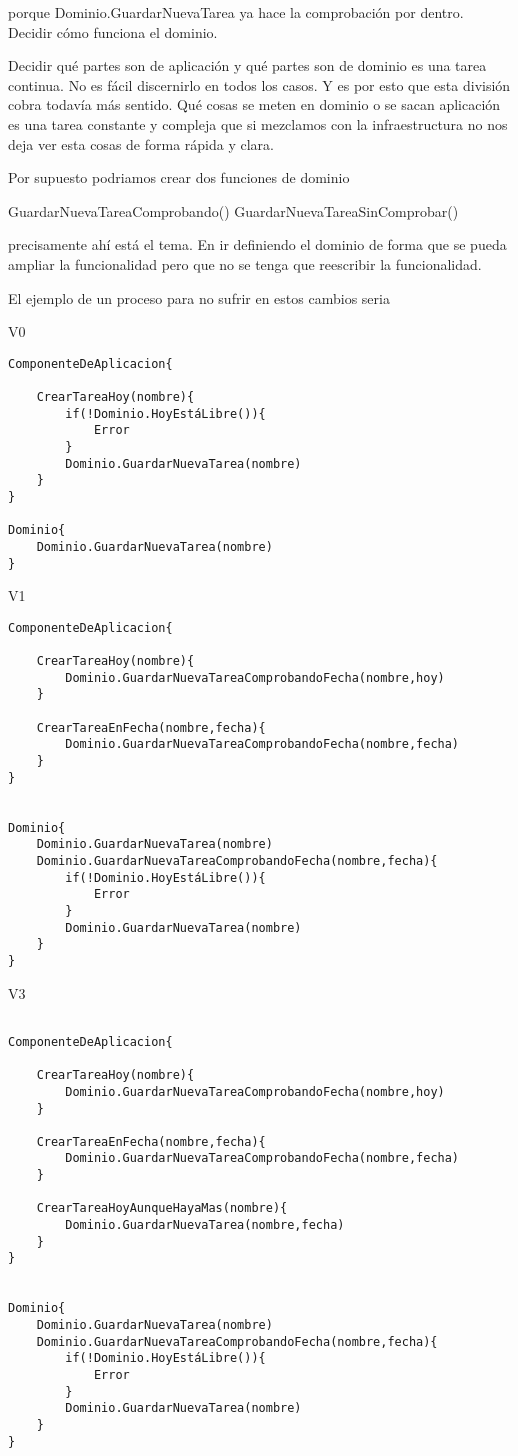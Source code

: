 porque Dominio.GuardarNuevaTarea ya hace la comprobación por dentro. Decidir cómo funciona el dominio.

Decidir qué partes son de aplicación y qué partes son de dominio es una tarea continua. No es fácil discernirlo en todos los casos. Y es por esto que esta división cobra todavía más sentido. Qué cosas se meten en dominio o se sacan aplicación es una tarea constante y compleja que si mezclamos con la infraestructura no nos deja ver esta cosas de forma rápida y clara.

Por supuesto podriamos crear dos funciones de dominio

GuardarNuevaTareaComprobando()
GuardarNuevaTareaSinComprobar()

precisamente ahí está el tema. En ir definiendo el dominio de forma que se pueda ampliar la funcionalidad pero que no se tenga que reescribir la funcionalidad.

El ejemplo de un proceso para no sufrir en estos cambios seria

V0

\begin{verbatim}
ComponenteDeAplicacion{

    CrearTareaHoy(nombre){
        if(!Dominio.HoyEstáLibre()){
            Error
        }
        Dominio.GuardarNuevaTarea(nombre)
    }
}

Dominio{
    Dominio.GuardarNuevaTarea(nombre)
}

\end{verbatim}

V1

\begin{verbatim}
ComponenteDeAplicacion{

    CrearTareaHoy(nombre){
        Dominio.GuardarNuevaTareaComprobandoFecha(nombre,hoy)
    }

    CrearTareaEnFecha(nombre,fecha){
        Dominio.GuardarNuevaTareaComprobandoFecha(nombre,fecha)
    }
}


Dominio{
    Dominio.GuardarNuevaTarea(nombre)
    Dominio.GuardarNuevaTareaComprobandoFecha(nombre,fecha){
        if(!Dominio.HoyEstáLibre()){
            Error
        }
        Dominio.GuardarNuevaTarea(nombre)
    }
}

\end{verbatim}

V3

\begin{verbatim}

ComponenteDeAplicacion{

    CrearTareaHoy(nombre){
        Dominio.GuardarNuevaTareaComprobandoFecha(nombre,hoy)
    }

    CrearTareaEnFecha(nombre,fecha){
        Dominio.GuardarNuevaTareaComprobandoFecha(nombre,fecha)
    }

    CrearTareaHoyAunqueHayaMas(nombre){
        Dominio.GuardarNuevaTarea(nombre,fecha)
    }
}


Dominio{
    Dominio.GuardarNuevaTarea(nombre)
    Dominio.GuardarNuevaTareaComprobandoFecha(nombre,fecha){
        if(!Dominio.HoyEstáLibre()){
            Error
        }
        Dominio.GuardarNuevaTarea(nombre)
    }
}
\end{verbatim}

